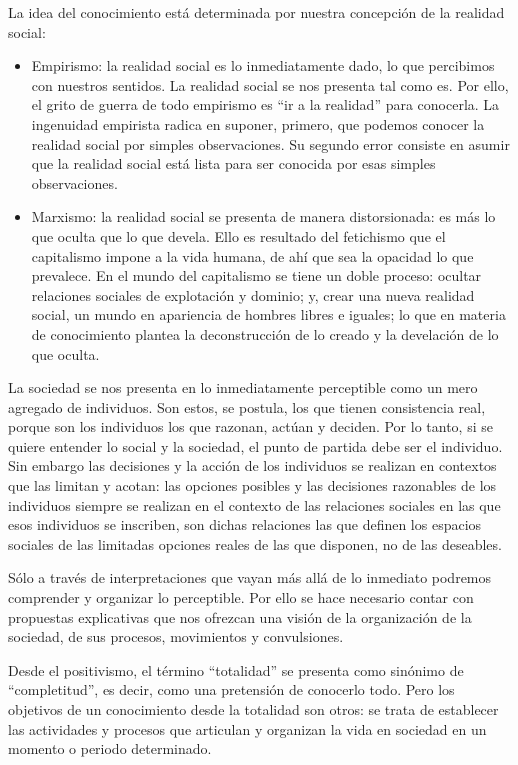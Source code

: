 \documentclass[
  letterpaper,
  DIV=11,
  numbers=noendperiod]{scrreprt}
\begin{document}
La idea del conocimiento está determinada por nuestra concepción de la
realidad social:

\begin{itemize}
\item
  Empirismo: la realidad social es lo inmediatamente dado, lo que
  percibimos con nuestros sentidos. La realidad social se nos presenta
  tal como es. Por ello, el grito de guerra de todo empirismo es ``ir a
  la realidad'' para conocerla. La ingenuidad empirista radica en
  suponer, primero, que podemos conocer la realidad social por simples
  observaciones. Su segundo error consiste en asumir que la realidad
  social está lista para ser conocida por esas simples observaciones.
\item
  Marxismo: la realidad social se presenta de manera distorsionada: es
  más lo que oculta que lo que devela. Ello es resultado del fetichismo
  que el capitalismo impone a la vida humana, de ahí que sea la opacidad
  lo que prevalece. En el mundo del capitalismo se tiene un doble
  proceso: ocultar relaciones sociales de explotación y dominio; y,
  crear una nueva realidad social, un mundo en apariencia de hombres
  libres e iguales; lo que en materia de conocimiento plantea la
  deconstrucción de lo creado y la develación de lo que oculta.
\end{itemize}

La sociedad se nos presenta en lo inmediatamente perceptible como un
mero agregado de individuos. Son estos, se postula, los que tienen
consistencia real, porque son los individuos los que razonan, actúan y
deciden. Por lo tanto, si se quiere entender lo social y la sociedad, el
punto de partida debe ser el individuo. Sin embargo las decisiones y la
acción de los individuos se realizan en contextos que las limitan y
acotan: las opciones posibles y las decisiones razonables de los
individuos siempre se realizan en el contexto de las relaciones sociales
en las que esos individuos se inscriben, son dichas relaciones las que
definen los espacios sociales de las limitadas opciones reales de las
que disponen, no de las deseables.

Sólo a través de interpretaciones que vayan más allá de lo inmediato
podremos comprender y organizar lo perceptible. Por ello se hace
necesario contar con propuestas explicativas que nos ofrezcan una visión
de la organización de la sociedad, de sus procesos, movimientos y
convulsiones.

Desde el positivismo, el término ``totalidad'' se presenta como sinónimo
de ``completitud'', es decir, como una pretensión de conocerlo todo.
Pero los objetivos de un conocimiento desde la totalidad son otros: se
trata de establecer las actividades y procesos que articulan y organizan
la vida en sociedad en un momento o periodo determinado.
\end{document}
